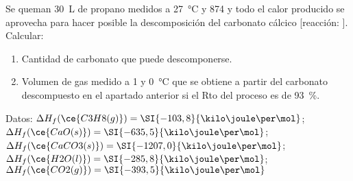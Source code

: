 Se queman \SI{30}{\liter} de propano medidos a \SI{27}{\celsius} y \SI{874}{\torr} y todo el calor producido se aprovecha para hacer posible la descomposición del carbonato cálcico [reacción: ]. Calcular:
\begin{enumerate}[label={\alph*)},font={\color{red!50!black}\bfseries}]
	\item Cantidad de carbonato que puede descomponerse.
	\item Volumen de gas medido a \SI{1}{\atm} y \SI{0}{\celsius} que se obtiene a partir del carbonato descompuesto en el apartado anterior si el Rto del proceso es de \SI{93}{\percent}.
\end{enumerate}
Datos:
$\Delta H_f(\ce{C3H8(g)} )   =  \SI{-103,8}{\kilo\joule\per\mol}$;
$\Delta H_f(\ce{CaO(s)}  )   =  \SI{-635,5}{\kilo\joule\per\mol}$; 
$\Delta H_f(\ce{CaCO3(s)})   = \SI{-1207,0}{\kilo\joule\per\mol}$;
$\Delta H_f(\ce{H2O(l)}  )   =  \SI{-285,8}{\kilo\joule\per\mol}$;
$\Delta H_f(\ce{CO2(g)}  )   =  \SI{-393,5}{\kilo\joule\per\mol}$

